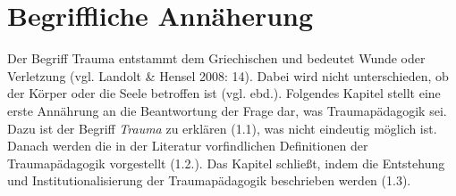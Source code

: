 \section{Begriffliche Annäherung}

Der Begriff Trauma entstammt dem Griechischen und bedeutet Wunde oder Verletzung (vgl. Landolt \& Hensel 2008: 14). Dabei wird nicht unterschieden, ob der Körper oder die Seele betroffen ist (vgl. ebd.). Folgendes Kapitel stellt eine erste Annährung an die Beantwortung der Frage dar, was Traumapädagogik sei. Dazu ist der Begriff \textit{Trauma} zu erklären (1.1), was nicht eindeutig möglich ist. Danach werden die in der Literatur vorfindlichen Definitionen der Traumapädagogik vorgestellt (1.2.). Das Kapitel schließt, indem die Entstehung und Institutionalisierung der Traumapädagogik beschrieben werden (1.3).

